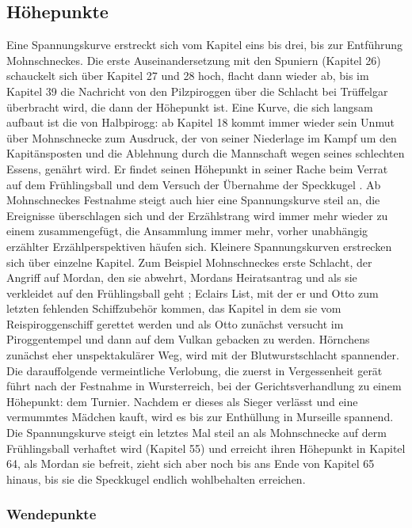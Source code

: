 \subsection{Höhepunkte}
Eine Spannungskurve erstreckt sich vom Kapitel eins bis drei, bis zur Entführung Mohnschneckes. Die erste Auseinandersetzung mit den Spuniern (Kapitel 26) schauckelt sich über Kapitel 27 und 28 hoch, flacht dann wieder ab, bis im Kapitel 39 die Nachricht von den Pilzpiroggen über die Schlacht bei Trüffelgar überbracht wird, die dann der Höhepunkt ist. Eine Kurve, die sich langsam aufbaut ist die von Halbpirogg: ab Kapitel 18 kommt immer wieder sein Unmut über Mohnschnecke zum Ausdruck, der von seiner Niederlage im Kampf um den Kapitänsposten und die Ablehnung durch die Mannschaft wegen seines schlechten Essens,  genährt wird. Er findet seinen Höhepunkt in seiner Rache beim Verrat auf dem Frühlingsball und dem Versuch der Übernahme der Speckkugel . Ab Mohnschneckes Festnahme steigt auch hier eine Spannungskurve steil an, die Ereignisse überschlagen sich und der Erzählstrang wird immer mehr wieder zu einem zusammengefügt, die Ansammlung immer mehr, vorher unabhängig erzählter Erzählperspektiven häufen sich. Kleinere Spannungskurven erstrecken sich über einzelne Kapitel. Zum Beispiel Mohnschneckes erste Schlacht, der Angriff auf Mordan, den sie abwehrt, Mordans Heiratsantrag und als sie verkleidet auf den Frühlingsball geht ; Eclairs List, mit der er und Otto zum letzten fehlenden Schiffzubehör kommen, das Kapitel in dem sie vom Reispiroggenschiff gerettet werden und als Otto zunächst versucht im Piroggentempel und dann auf dem Vulkan gebacken zu werden. Hörnchens zunächst eher unspektakulärer Weg, wird mit der Blutwurstschlacht spannender. Die darauffolgende vermeintliche Verlobung, die zuerst in Vergessenheit gerät führt nach der Festnahme in Wursterreich, bei der Gerichtsverhandlung zu einem Höhepunkt: dem Turnier. Nachdem er dieses als Sieger verlässt und eine vermummtes Mädchen kauft, wird es bis zur Enthüllung in Murseille spannend. Die Spannungskurve steigt ein letztes Mal steil an als Mohnschnecke auf derm Frühlingsball verhaftet wird (Kapitel 55) und erreicht ihren Höhepunkt in Kapitel 64, als Mordan sie befreit, zieht sich aber noch bis ans Ende von Kapitel 65 hinaus, bis sie die Speckkugel endlich wohlbehalten erreichen.

\subsubsection{Wendepunkte}

